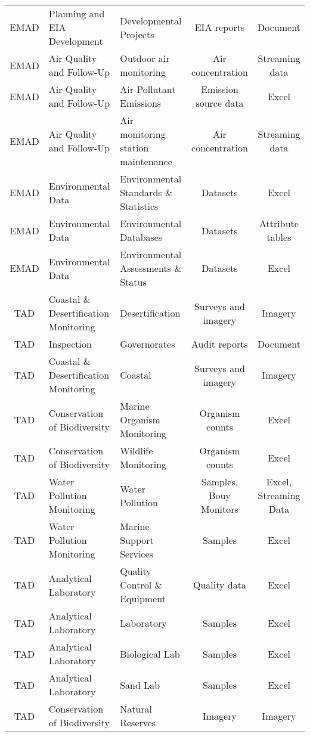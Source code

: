 \begin{table}[H]
{\begin{tabular}{@{}cllcc@{}}
EMAD & Planning and  EIA Development & Developmental Projects & EIA reports & Document \\
EMAD & Air Quality and Follow-Up & Outdoor air monitoring & Air concentration & Streaming data \\
EMAD & Air Quality and Follow-Up & Air Pollutant Emissions & Emission source data & Excel \\
EMAD & Air Quality and Follow-Up & Air monitoring station maintenance & Air concentration & Streaming data \\
EMAD & Environmental Data & Environmental Standards \& Statistics & Datasets & Excel \\
EMAD & Environmental Data & Environmental Databases & Datasets & Attribute tables \\
EMAD & Environmental Data & Environmental Assessments \& Status & Datasets & Excel \\
TAD & Coastal \& Desertification Monitoring & Desertification & Surveys and imagery & Imagery \\
TAD & Inspection & Governorates & Audit reports & Document \\
TAD & Coastal \& Desertification Monitoring & Coastal & Surveys and imagery & Imagery \\
TAD & Conservation of Biodiversity & Marine Organism Monitoring & Organism counts & Excel \\
TAD & Conservation of Biodiversity & Wildlife Monitoring & Organism counts & Excel \\
TAD & Water Pollution Monitoring & Water Pollution & Samples, Bouy Monitors & Excel, Streaming Data \\
TAD & Water Pollution Monitoring & Marine Support Services & Samples & Excel \\
TAD & Analytical Laboratory & Quality Control \& Equipment & Quality data & Excel \\
TAD & Analytical Laboratory & Laboratory & Samples & Excel \\
TAD & Analytical Laboratory & Biological Lab & Samples & Excel \\
TAD & Analytical Laboratory & Sand Lab & Samples & Excel \\
TAD & Conservation of Biodiversity & Natural Reserves & Imagery & Imagery \\ \bottomrule
\end{tabular}
}%
\end{table}

